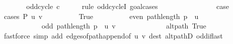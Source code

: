 \begin{isabellebody}
\ \ \ \ \isamarkupfalse%
\ \isamarkupfalse%
\ {\isachardoublequoteopen}odd{\isacharunderscore}{\kern0pt}cycle\ {\isacharquery}{\kern0pt}c{\isachardoublequoteclose}\isanewline
\ \ \ \ \isamarkupfalse%
\ {\isacharparenleft}{\kern0pt}rule\ odd{\isacharunderscore}{\kern0pt}cycleI{\isacharcomma}{\kern0pt}\ goal{\isacharunderscore}{\kern0pt}cases{\isacharparenright}{\kern0pt}\isanewline
\ \ \ \ \ \ \isamarkupfalse%
\ {}\isanewline
\ \ \ \ \ \ \isamarkupfalse%
\ {\isacharquery}{\kern0pt}case\isanewline
\ \ \ \ \ \ \isamarkupfalse%
\ {\isacharparenleft}{\kern0pt}cases\ {\isachardoublequoteopen}P{\isacharprime}{\kern0pt}{\isacharprime}{\kern0pt}\ {\isacharbraceleft}{\kern0pt}u{\isacharcomma}{\kern0pt}\ v{\isacharbraceright}{\kern0pt}{\isachardoublequoteclose}{\isacharparenright}{\kern0pt}\isanewline
\ \ \ \ \ \ \ \ \isamarkupfalse%
\ True\isanewline
\ \ \ \ \ \ \ \ \isamarkupfalse%
\ {\isachardoublequoteopen}even\ {\isacharparenleft}{\kern0pt}path{\isacharunderscore}{\kern0pt}length\ {\isacharparenleft}{\kern0pt}p\ {\isacharat}{\kern0pt}\ {\isacharbrackleft}{\kern0pt}u{\isacharbrackright}{\kern0pt}{\isacharparenright}{\kern0pt}{\isacharparenright}{\kern0pt}{\isachardoublequoteclose}\isanewline
\ \ \ \ \ \ \ \ \isamarkupfalse%
\ {\isacharminus}{\kern0pt}\isanewline
\ \ \ \ \ \ \ \ \ \ \isamarkupfalse%
\ {\isachardoublequoteopen}odd\ {\isacharparenleft}{\kern0pt}path{\isacharunderscore}{\kern0pt}length\ {\isacharparenleft}{\kern0pt}p\ {\isacharat}{\kern0pt}\ {\isacharbrackleft}{\kern0pt}u{\isacharcomma}{\kern0pt}\ v{\isacharbrackright}{\kern0pt}{\isacharparenright}{\kern0pt}{\isacharparenright}{\kern0pt}{\isachardoublequoteclose}\isanewline
\ \ \ \ \ \ \ \ \ \ \ \ \isamarkupfalse%
\ alt{\isacharunderscore}{\kern0pt}path\ True\isanewline
\ \ \ \ \ \ \ \ \ \ \ \ \isamarkupfalse%
\ {\isacharparenleft}{\kern0pt}fastforce\ simp\ add{\isacharcolon}{\kern0pt}\ edges{\isacharunderscore}{\kern0pt}of{\isacharunderscore}{\kern0pt}path{\isacharunderscore}{\kern0pt}append{\isacharunderscore}{\kern0pt}{}{\isacharbrackleft}{\kern0pt}of\ {\isachardoublequoteopen}{\isacharbrackleft}{\kern0pt}u{\isacharcomma}{\kern0pt}\ v{\isacharbrackright}{\kern0pt}{\isachardoublequoteclose}{\isacharbrackright}{\kern0pt}\ dest{\isacharcolon}{\kern0pt}\ alt{\isacharunderscore}{\kern0pt}pathD{\isacharparenleft}{\kern0pt}{}{\isacharparenright}{\kern0pt}\ odd{\isacharunderscore}{\kern0pt}if{\isacharunderscore}{\kern0pt}last{\isacharparenright}{\kern0pt}\isanewline

\end{isabellebody}
